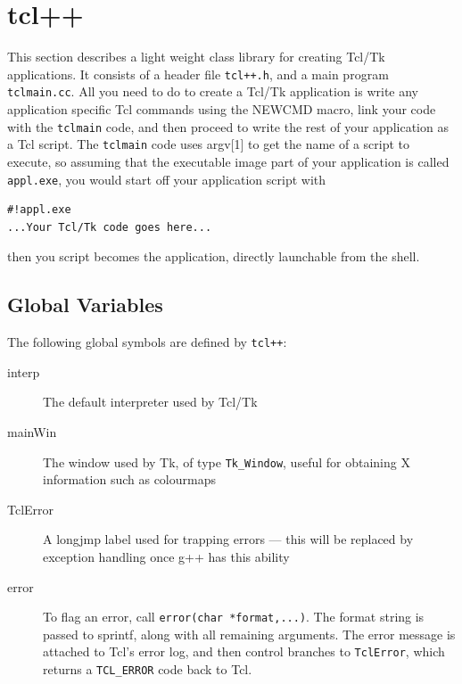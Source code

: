 \section{tcl++}\label{tcl++}

This section describes a light weight class library for creating
Tcl/Tk applications. \cite{Ousterhout94} It consists of a header file
\verb|tcl++.h|, and a main program \verb|tclmain.cc|. All you need to
do to create a Tcl/Tk application is write any application specific
Tcl commands using the NEWCMD macro, link your code with the
\verb|tclmain| code, and then proceed to write the rest of your
application as a Tcl script. The \verb|tclmain| code uses argv[1] to
get the name of a script to execute, so assuming that the executable
image part of your application is called \verb|appl.exe|, you would
start off your application script with
\begin{verbatim}
#!appl.exe
...Your Tcl/Tk code goes here...
\end{verbatim}
then you script becomes the application, directly launchable from the
shell.

\subsection{Global Variables}

The following global symbols are defined by \verb|tcl++|:
\begin{description}
\item[interp] The default interpreter used by Tcl/Tk
\item[mainWin] The window used by Tk, of type \verb|Tk_Window|, useful
for obtaining X information such as colourmaps
\item[TclError] A longjmp label used for trapping errors --- this will
be replaced by exception handling once g++ has this ability
\item[error] To flag an error, call \verb|error(char *format,...)|.
The format string is passed to sprintf, along with all remaining
arguments. The error message is attached to Tcl's error log, and then
control branches to \verb|TclError|, which returns a \verb|TCL_ERROR|
code back to Tcl.
\end{description}

